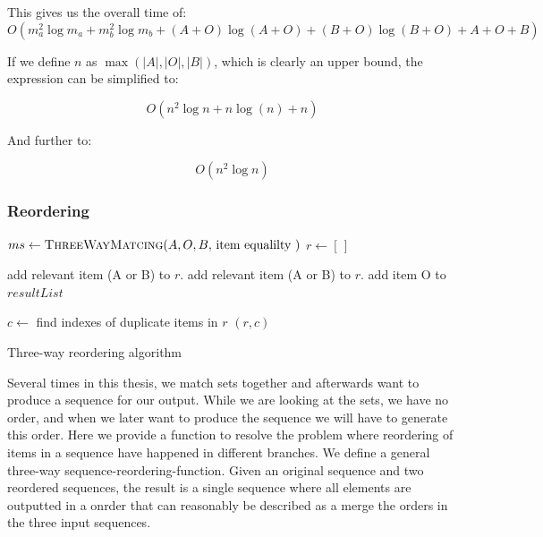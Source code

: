\documentclass[11pt]{article}
\begin{document}
This gives us the overall time of:
\begin{equation}
O(m_{a}^2 \log m_{a} + m_{b}^2 \log m_{b} + (A+O) \log (A+O) + (B+O) \log (B+O) + A + O + B) \nonumber
\end{equation}

If we define $n$ as $\max(|A|, |O|, |B|)$, which is clearly an upper bound, the expression can be simplified to:

\begin{equation}
O(n^2 \log n + n \log (n) + n) \nonumber
\end{equation}

And further to:

\begin{equation}
O(n^2 \log n) \nonumber
\end{equation}

\subsubsection{Reordering}
\label{ThreeWayReorderingAlgorithmSec}

\begin{algorithm}
\begin{algorithmic}
   \State $ms \gets \Call{ThreeWayMatcing}{A, O, B, $ item equalilty $}$
   \State $r \gets [\,]$
   
         \State add relevant item (A or B) to $r$.
      \EndIf
         \State add relevant item (A or B) to $r$.
      \EndIf
         \State add item O to $resultList$
      \EndIf
      
	\EndFor
	\State $c \gets$ find indexes of duplicate items in $r$
	\State \Return $(r, c)$
\EndFunction
\end{algorithmic}
\caption{Three-way reordering algorithm}
  \label{ThreeWayReorderingAlgorithm}
\end{algorithm}


Several times in this thesis, we match sets together and afterwards want to produce a sequence for our output. While we are looking at the sets, we have no order, and when we later want to produce the sequence we will have to generate this order. Here we provide a function to resolve the problem where reordering of items in a sequence have happened in different branches. We define a general three-way sequence-reordering-function. Given an original sequence and two reordered sequences, the result is a single sequence where all elements are outputted in a onrder that can reasonably be described as a merge the orders in the three input sequences.
\end{document}
